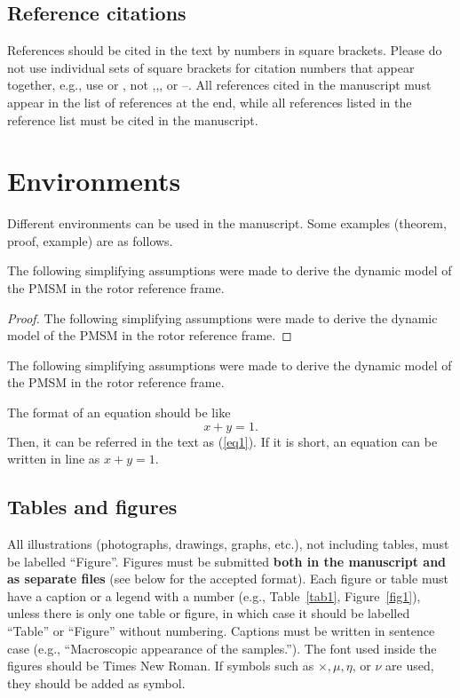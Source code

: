 \documentclass{article}
\begin{document}
\subsection{Reference citations}
References should be cited in the text by numbers in square brackets. Please do not use individual sets of square brackets for citation numbers that appear together, e.g., use \cite{ref1,ref4} or \cite{ref1,ref2,ref3,ref5}, not \cite{ref1},\cite{ref2},\cite{ref3}, or \cite{ref4}--\cite{ref6}. All references cited in the manuscript must appear in the list of references at the end, while all references listed in the reference list must be cited in the manuscript.

\section{Environments}
Different environments can be used in the manuscript. Some examples (theorem, proof, example) are as follows.

\begin{theorem} \label{the1}
The following simplifying assumptions were made to derive the dynamic model of the PMSM in the rotor reference frame.
\end{theorem}

\begin{proof}
The following simplifying assumptions were made to derive the dynamic model of the PMSM in the rotor reference frame.
\end{proof}

\begin{example}\label{exm1}
The following simplifying assumptions were made to derive the dynamic model of the PMSM in the rotor reference frame.
\end{example}

The format of an equation should be like
\begin{equation}
\label{eq1}
x+y = 1.
\end{equation}
Then, it can be referred in the text as (\ref{eq1}). If it is short, an equation can be written in line as $x+y=1$.


\subsection{Tables and figures}
All illustrations (photographs, drawings, graphs, etc.), not including tables, must be labelled ``Figure''. Figures must be submitted \textbf{both in the manuscript and as separate files} (see below for the accepted format). Each figure or table must have a caption or a legend with a number (e.g., Table~\ref{tab1}, Figure~\ref{fig1}), unless there is only one table or figure, in which case it should be labelled ``Table'' or ``Figure'' without numbering. Captions must be written in sentence case (e.g., ``Macroscopic appearance of the samples.''). The font used inside the figures should be Times New Roman. If symbols such as $\times, \mu, \eta$, or $\nu$ are used, they should be added as symbol.
\end{document}
